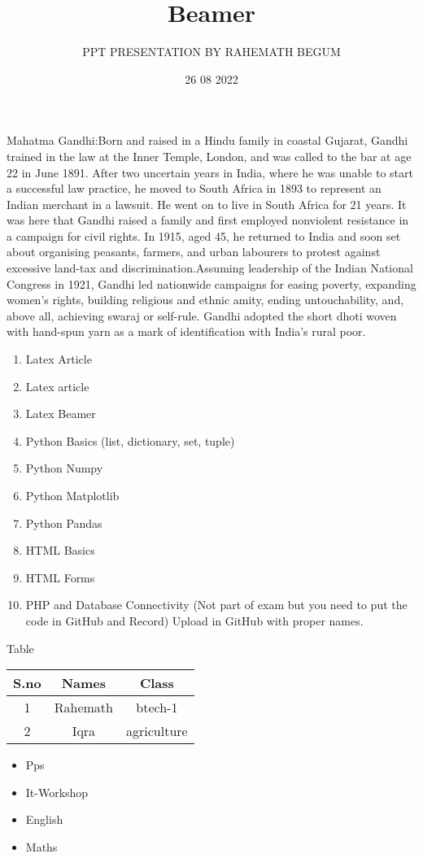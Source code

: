 \documentclass{beamer}
\title{Beamer}
\author{ PPT PRESENTATION BY RAHEMATH BEGUM}
\date{26 08 2022}
\begin{document}
\maketitle
\begin{frame}Mahatma Gandhi:Born and raised in a Hindu family in coastal Gujarat, Gandhi trained in the law at the Inner Temple, London, and was called to the bar at age 22 in June 1891. After two uncertain years in India, where he was unable to start a successful law practice, he moved to South Africa in 1893 to represent an Indian merchant in a lawsuit. He went on to live in South Africa for 21 years. It was here that Gandhi raised a family and first employed nonviolent resistance in a campaign for civil rights. In 1915, aged 45, he returned to India and soon set about organising peasants, farmers, and urban labourers to protest against excessive land-tax and discrimination.Assuming leadership of the Indian National Congress in 1921, Gandhi led nationwide campaigns for easing poverty, expanding women's rights, building religious and ethnic amity, ending untouchability, and, above all, achieving swaraj or self-rule. Gandhi adopted the short dhoti woven with hand-spun yarn as a mark of identification with India's rural poor. 

\end{frame}
\begin{frame}
\begin{enumerate}
\item Latex Article
\item Latex article
\item Latex Beamer 
\item Python Basics (list, dictionary, set, tuple)
\item Python Numpy
\item Python Matplotlib
\item Python Pandas
\item HTML Basics
\item HTML Forms
\item PHP and Database Connectivity (Not part of exam but you need to put the code in GitHub and Record)
Upload in GitHub with proper names.
\end{enumerate}
\end{frame}
\begin{frame}{Table}
   \begin{tabular}{|c|c|c|}
 \hline
S.no & Names & Class\\
\hline
1 & Rahemath & btech-1 \\
\hline
2 & Iqra & agriculture\\
\hline
   \end{tabular} 
\end{frame}
\begin{itemize}
    \item Pps
    \item It-Workshop
    \item English
    \item Maths
\end{itemize}
\end{document}
